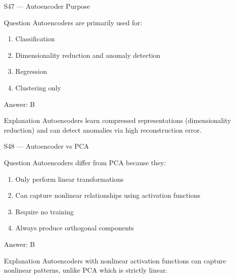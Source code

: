 \documentclass[aspectratio=169,8pt]{beamer}
\begin{document}
	\begin{frame}{S47 --- Autoencoder Purpose}
		\begin{block}{Question}
			Autoencoders are primarily used for:
			\begin{enumerate}
				\item Classification
				\item Dimensionality reduction and anomaly detection
				\item Regression
				\item Clustering only
			\end{enumerate}
		\end{block}
		\begin{exampleblock}{Answer: B}\end{exampleblock}
		\begin{block}{Explanation}
			Autoencoders learn compressed representations (dimensionality reduction) and can detect anomalies via high reconstruction error.
		\end{block}
	\end{frame}
	
	\begin{frame}{S48 --- Autoencoder vs PCA}
		\begin{block}{Question}
			Autoencoders differ from PCA because they:
			\begin{enumerate}
				\item Only perform linear transformations
				\item Can capture nonlinear relationships using activation functions
				\item Require no training
				\item Always produce orthogonal components
			\end{enumerate}
		\end{block}
		\begin{exampleblock}{Answer: B}\end{exampleblock}
		\begin{block}{Explanation}
			Autoencoders with nonlinear activation functions can capture nonlinear patterns, unlike PCA which is strictly linear.
		\end{block}
	\end{frame}
	
\end{document}
